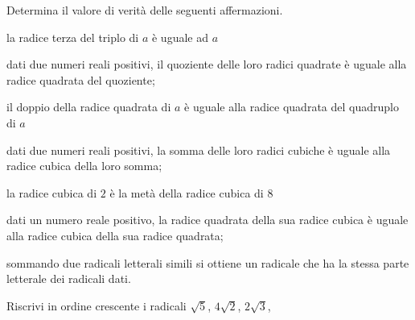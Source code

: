 \begin{esercizio}%
Determina il valore di verità delle seguenti affermazioni.
\begin{enumeratea}
 \item la radice terza del triplo di \(a\) è uguale ad \(a\)
 \item dati due numeri reali positivi, il quoziente delle loro radici 
  quadrate è uguale alla radice quadrata del quoziente;
 \item il doppio della radice quadrata di \(a\) è uguale alla radice quadrata 
  del quadruplo di \(a\)
 \item dati due numeri reali positivi, la somma delle loro radici cubiche è 
  uguale alla radice cubica della loro somma;
 \item la radice cubica di \(2\) è la metà della radice cubica di \(8\)
 \item dati un numero reale positivo, la radice quadrata della sua radice 
  cubica è uguale alla radice cubica della sua radice quadrata;
 \item sommando due radicali letterali simili si ottiene un radicale che ha la 
  stessa parte letterale dei radicali dati.
\end{enumeratea}
\end{esercizio}

\begin{esercizio}%
Riscrivi in ordine crescente i radicali \(\sqrt 5\), \(4\sqrt 2\), \(2\sqrt 3\),
\end{esercizio}

% 

